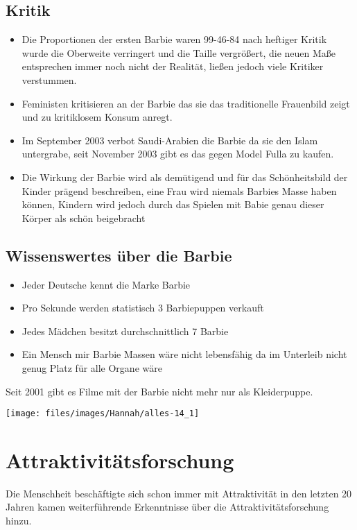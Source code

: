 \subsection{Kritik}
\begin{itemize}
	\item Die Proportionen der ersten Barbie waren 99-46-84 nach heftiger Kritik wurde die
		Oberweite verringert und die Taille vergrößert, die neuen Maße entsprechen immer noch
		nicht der Realität, ließen jedoch viele Kritiker verstummen.
	\item Feministen kritisieren an der Barbie das sie das traditionelle Frauenbild zeigt und zu
		kritiklosem Konsum anregt.
	\item Im September 2003 verbot Saudi-Arabien die Barbie da sie den Islam untergrabe, seit
		November 2003 gibt es das gegen Model Fulla zu kaufen.
	\item Die Wirkung der Barbie wird als demütigend und für das Schönheitsbild der Kinder prägend
		beschreiben, eine Frau wird niemals Barbies Masse haben können, Kindern wird jedoch durch das
		Spielen mit Babie genau dieser Körper als schön beigebracht
\end{itemize}

\subsection{Wissenswertes über die Barbie}
\begin{itemize}
	\item Jeder Deutsche kennt die Marke Barbie
	\item Pro Sekunde werden statistisch 3 Barbiepuppen verkauft
	\item Jedes Mädchen besitzt durchschnittlich 7 Barbie
	\item Ein Mensch mir Barbie Massen wäre nicht lebensfähig da im Unterleib nicht genug Platz
		für alle Organe wäre
\end{itemize}

Seit 2001 gibt es Filme mit der Barbie nicht mehr nur als Kleiderpuppe.

\begin{figurewrapper}
	\texttt{[image: files/images/Hannah/alles-14\_1]}%
\end{figurewrapper}

\section{Attraktivitätsforschung}
Die Menschheit beschäftigte sich schon immer mit Attraktivität in den letzten 20 Jahren kamen
weiterführende Erkenntnisse über die Attraktivitätsforschung hinzu.

